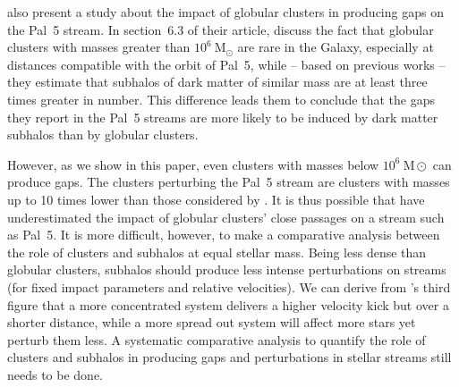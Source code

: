     \citet{2017MNRAS.470...60E} also present a study about the impact of globular clusters in producing gaps on the Pal~5 stream. In section~6.3 of their article, \citet{2017MNRAS.470...60E} discuss the fact that globular clusters with masses greater than $10^6~\textrm{M}_\odot$ are rare in the Galaxy, especially at distances compatible with the orbit of Pal~5, while -- based on previous works -- they estimate that subhalos of dark matter of similar mass are at least three times greater in number. This difference leads them to conclude that the gaps they report in the Pal~5 streams are more likely to be induced by dark matter subhalos than by globular clusters. 
  
    However, as we show in this paper, even clusters with masses below $10^6~\textrm{M}\odot$ can produce gaps. The clusters perturbing the Pal~5 stream are clusters with masses up to 10 times lower than those considered by \citet{2017MNRAS.470...60E}. It is thus possible that \citet{2017MNRAS.470...60E} have underestimated the impact of globular clusters' close passages on a stream such as Pal~5. It is more difficult, however, to make a comparative analysis between the role of clusters and subhalos at equal stellar mass. Being less dense than globular clusters, subhalos should produce less intense perturbations on streams (for fixed impact parameters and relative velocities). We can derive from \citet{2016MNRAS.457.3817S}'s third figure that a more concentrated system delivers a higher velocity kick but over a shorter distance, while a more spread out system will affect more stars yet perturb them less. A systematic comparative analysis to quantify the role of clusters and subhalos in producing gaps and perturbations in stellar streams still needs to be done.


